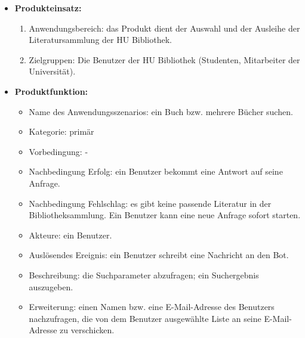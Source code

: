 \documentclass[12pt,a4paper]{scrartcl}
\begin{document}
\begin{itemize}
\item \textbf{Produkteinsatz:}

\begin{enumerate}
	\item Anwendungsbereich: das Produkt dient der Auswahl und der Ausleihe der Literatursammlung der HU Bibliothek.
\item Zielgruppen: Die Benutzer der HU Bibliothek (Studenten, Mitarbeiter der Universität).
\end{enumerate}
 
\item \textbf{Produktfunktion:} 
\begin{itemize}
\item Name des Anwendungsszenarios: ein Buch bzw. mehrere Bücher suchen.
\item Kategorie: primär
\item Vorbedingung: -
\item Nachbedingung Erfolg: ein Benutzer bekommt eine Antwort auf seine Anfrage.
\item Nachbedingung Fehlschlag: es gibt keine passende Literatur in der Bibliotheksammlung. Ein Benutzer kann eine neue Anfrage sofort starten.
\item Akteure: ein Benutzer.
\item Auslösendes Ereignis: ein Benutzer schreibt eine Nachricht an den Bot.
\item Beschreibung: die Suchparameter abzufragen; ein Suchergebnis auszugeben.
\item Erweiterung: einen Namen bzw. eine E-Mail-Adresse des Benutzers nachzufragen, die von dem Benutzer ausgewählte Liste an seine E-Mail-Adresse zu verschicken.
	\end{itemize}
\end{itemize}
\end{document}
